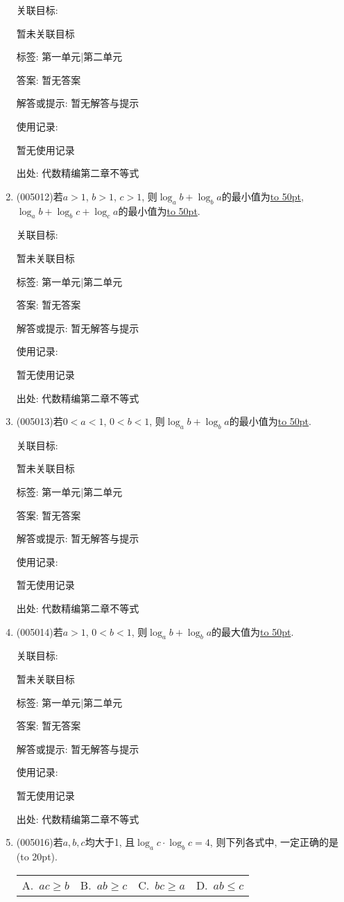 \documentclass[10pt,a4paper]{article}
\newcommand{\blank}[1]{\underline{\hbox to #1pt{}}}
\newcommand{\bracket}[1]{(\hbox to #1pt{})}
\newcommand{\fourch}[4]{\par\begin{tabular}{p{.23\textwidth}p{.23\textwidth}p{.23\textwidth}p{.23\textwidth}}
A.~#1 &B.~#2& C.~#3& D.~#4
\end{tabular}}
\begin{document}
\begin{enumerate}[1.]
关联目标:

暂未关联目标



标签: 第一单元|第二单元

答案: 暂无答案

解答或提示: 暂无解答与提示

使用记录:

暂无使用记录


出处: 代数精编第二章不等式
\item { (005012)}若$a>1$, $b>1$, $c>1$, 则$\log_ab+\log_ba$的最小值为\blank{50}, $\log_ab+\log_bc+\log_ca$的最小值为\blank{50}.


关联目标:

暂未关联目标



标签: 第一单元|第二单元

答案: 暂无答案

解答或提示: 暂无解答与提示

使用记录:

暂无使用记录


出处: 代数精编第二章不等式
\item { (005013)}若$0<a<1$, $0<b<1$, 则$\log_ab+\log_ba$的最小值为\blank{50}.


关联目标:

暂未关联目标



标签: 第一单元|第二单元

答案: 暂无答案

解答或提示: 暂无解答与提示

使用记录:

暂无使用记录


出处: 代数精编第二章不等式
\item { (005014)}若$a>1$, $0<b<1$, 则$\log_ab+\log_ba$的最大值为\blank{50}.


关联目标:

暂未关联目标



标签: 第一单元|第二单元

答案: 暂无答案

解答或提示: 暂无解答与提示

使用记录:

暂无使用记录


出处: 代数精编第二章不等式
\item { (005016)}若$a,b,c$均大于1, 且$\log_ac\cdot \log_bc=4$, 则下列各式中, 一定正确的是\bracket{20}.
\fourch{$ac\ge b$}{$ab\ge c$}{$bc\ge a$}{$ab\le c$}



\end{enumerate}
\end{document}
